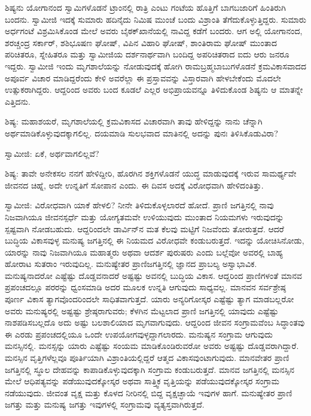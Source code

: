ಶಿಷ್ಯನು ಯೋಗಾನಂದ ಸ್ವಾಮಿಗಳೊಡನೆ ಟ್ರಾಂನಲ್ಲಿ ರಾತ್ರಿ ಎಂಟು ಗಂಟೆಯ ಹೊತ್ತಿಗೆ ಬಾಗಬಜಾರಿಗೆ ಹಿಂತಿರುಗಿ ಬಂದನು. ಸ್ವಾಮೀಜಿ ಇದಕ್ಕೆ ಸುಮಾರು ಹದಿನೈದು ನಿಮಿಷ ಮುಂಚೆ ಬಂದು ವಿಶ್ರಾಂತಿ ತೆಗೆದುಕೊಳ್ಳುತ್ತಿದ್ದರು. ಸುಮಾರು ಅರ್ಧಗಂಟೆ ವಿಶ್ರಮಿಸಿಕೊಂಡ ಮೇಲೆ ಅವರು ಬೈಠಕ್‌ಖಾನೆಯಲ್ಲಿ ನಾವಿದ್ದ ಕಡೆಗೆ ಬಂದರು. ಆಗ ಅಲ್ಲಿ ಯೋಗಾನಂದ, ಶರಚ್ಚಂದ್ರ ಸರ್ಕಾರ್, ಶಶಿಭೂಷಣ ಘೋಷ್, ವಿಪಿನ ವಿಹಾರಿ ಘೋಷ್, ಶಾಂತಿರಾಮ ಘೋಷ್ ಮುಂತಾದ ಪರಿಚಿತರೂ, ಸ್ನೇಹಿತರೂ ಮತ್ತು ಸ್ವಾಮೀಜಿಯ ದರ್ಶನಾರ್ಥವಾಗಿ ಬಂದಿದ್ದ ಅಪರಿಚಿತರಾದ ಐದು ಆರು ಜನರೂ ಇದ್ದರು. ಸ್ವಾಮೀಜಿ ಇಂದು ಮೃಗಶಾಲೆಯನ್ನು ನೋಡುವುದಕ್ಕೆ ಹೋಗಿ ರಾಮಬ್ರಹ್ಮಬಾಬುಗಳೊಡನೆ ಕ್ರಮವಿಕಾಸವಾದದ ಅಪೂರ್ವ ವಿಚಾರ ಮಾಡಿದ್ದರೆಂದು ಕೇಳಿ ಅವರೆಲ್ಲಾ ಈ ಪ್ರಸ್ತಾವವನ್ನು ವಿಸ್ತಾರವಾಗಿ ಹೇಳಬೇಕೆಂದು ಮೊದಲೇ ಉತ್ಸುಕರಾಗಿದ್ದರು. ಆದ್ದರಿಂದ ಅವರು ಬಂದ ಕೂಡಲೆ ಎಲ್ಲರ ಅಭಿಪ್ರಾಯವನ್ನೂ ತಿಳಿದುಕೊಂಡ ಶಿಷ್ಯನು ಆ ಮಾತನ್ನೇ ಎತ್ತಿದನು.

ಶಿಷ್ಯ: ಮಹಾಶಯರೆ, ಮೃಗಶಾಲೆಯಲ್ಲಿ ಕ್ರಮವಿಕಾಸದ ವಿಚಾರವಾಗಿ ತಾವು ಹೇಳಿದ್ದನ್ನು ನಾನು ಚೆನ್ನಾಗಿ ಅರ್ಥಮಾಡಿಕೊಳ್ಳುವುದಕ್ಕಾಗಲಿಲ್ಲ. ದಯಮಾಡಿ ಸುಲಭವಾದ ಮಾತಿನಲ್ಲಿ ಅದನ್ನು ಪುನಃ ತಿಳಿಸಿಕೊಡುವಿರಾ?

ಸ್ವಾಮೀಜಿ: ಏಕೆ, ಅರ್ಥವಾಗಲಿಲ್ಲವೆ?

ಶಿಷ್ಯ: ತಾವೇ ಅನೇಕಸಲ ನನಗೆ ಹೇಳಿದ್ದೀರಿ, ಹೊರಗಿನ ಶಕ್ತಿಗಳೊಡನೆ ಯುದ್ಧ ಮಾಡುವುದಕ್ಕೆ ಇರುವ ಸಾಮರ್ಥ್ಯವೇ ಜೀವನದ ಚಿಹ್ನೆ, ಅದೇ ಉನ್ನತಿಗೆ ಸೋಪಾನ ಎಂದು. ಈ ದಿವಸ ಅದಕ್ಕೆ ವಿರೋಧವಾಗಿ ಹೇಳಿದಂತಿತ್ತು.

ಸ್ವಾಮೀಜಿ: ವಿರೋಧವಾಗಿ ಯಾಕೆ ಹೇಳಲಿ? ನೀನೇ ತಿಳಿದುಕೊಳ್ಳಲಾರದೆ ಹೋದೆ. ಪ್ರಾಣಿ ಜಗತ್ತಿನಲ್ಲಿ ನಾವು ನಿಜವಾಗಿಯೂ ಜೀವನಸ್ಪರ್ಧೆ ಮತ್ತು ಯೋಗ್ಯತಮವೇ ಉಳಿಯುವುದು ಮುಂತಾದ ನಿಯಮಗಳು ಇರುವುದನ್ನು ಸ್ಪಷ್ಟವಾಗಿ ನೋಡಬಹುದು. ಆದ್ದರಿಂದಲೇ ಡಾರ್ವಿನ್‌ನ ಮತ ಕೆಲವು ಮಟ್ಟಿಗೆ ನಿಜವೆಂದು ತೋರುತ್ತದೆ. ಆದರೆ ಬುದ್ಧಿಯ ವಿಕಾಸವುಳ್ಳ ಮನುಷ್ಯ ಜಗತ್ತಿನಲ್ಲಿ ಈ ನಿಯಮದ ವಿರೋಧವೇ ಕಂಡುಬರುತ್ತದೆ. ಇದನ್ನು ಯೋಚಿಸಿನೋಡು, ಯಾರನ್ನು ನಾವು ನಿಜವಾಗಿಯೂ ಮಹಾತ್ಮರು ಅಥವಾ ಆದರ್ಶ ಪುರುಷರು ಎಂದು ಬಲ್ಲೆವೋ ಅವರಲ್ಲಿ ಬಾಹ್ಯ ಹೋರಾಟ ಸುತರಾಂ ಇರುವುದಿಲ್ಲ. ಮನುಷ್ಯೇತರ ಪ್ರಾಣಿಜಗತ್ತಿನಲ್ಲಿ ಜ್ಞಾನದ ಪ್ರಾಬಲ್ಯ ಅಸ್ವಾಭಾವಿಕ. ಮನುಷ್ಯನಾದರೋ ಎಷ್ಟೆಷ್ಟು ದೊಡ್ಡವನಾದರೆ ಅಷ್ಟಷ್ಟು ಅವನಲ್ಲಿ ಬುದ್ಧಿಯ ವಿಕಾಸ. ಆದ್ದರಿಂದ ಪ್ರಾಣಿಗಳಂತೆ ಮಾನವ ಪ್ರಪಂಚದಲ್ಲೂ ಪರರನ್ನು ಧ್ವಂಸಮಾಡಿ ಅದರ ಮೂಲಕ ಉನ್ನತಿ ಆಗುವುದು ಸಾಧ್ಯವಲ್ಲ. ಮಾನವನ ಸರ್ವಶ್ರೇಷ್ಠ ಪೂರ್ಣ ವಿಕಾಸ ತ್ಯಾಗವೊಂದರಿಂದಲೇ ಸಾಧಿತವಾಗುತ್ತದೆ. ಯಾರು ಅನ್ಯರಿಗೋಸ್ಕರ ಎಷ್ಟೆಷ್ಟು ತ್ಯಾಗ ಮಾಡಬಲ್ಲರೋ ಅವರು ಮನುಷ್ಯರಲ್ಲಿ ಅಷ್ಟಷ್ಟು ಶ್ರೇಷ್ಠರಾಗುವರು; ಕೆಳಗಿನ ಮೆಟ್ಟಲಾದ ಪ್ರಾಣಿ ಜಗತ್ತಿನಲ್ಲಿ ಯಾವುದು ಎಷ್ಟೆಷ್ಟು ನಾಶಪಡಿಸಬಲ್ಲದೊ ಅದು ಅಷ್ಟು ಬಲಶಾಲಿಯಾದ ಮೃಗವಾಗುವುದು. ಆದ್ದರಿಂದ ಜೀವನ ಸಂಗ್ರಾಮವೆಂಬ ಸಿದ್ಧಾಂತವು ಈ ಎರಡು ಪ್ರಪಂಚದಲ್ಲಿಯೂ ಒಂದೇ ಉಪಯೋಗವುಳ್ಳದ್ದಾಗಲಾರದು. ಮನುಷ್ಯನ ಸಂಗ್ರಾಮ ಆಗುವುದು ಮನಸ್ಸಿನಲ್ಲಿ. ಮನಸ್ಸನ್ನು ಯಾರು ಎಷ್ಟೆಷ್ಟು ಸಂಯಮ ಮಾಡಿಕೊಂಡಿರುವರೋ ಅವರು ಅಷ್ಟಷ್ಟು ದೊಡ್ಡವರಾಗಿದ್ದಾರೆ. ಮನಸ್ಸಿನ ವೃತ್ತಿಗಳೆಲ್ಲವೂ ಪೂರ್ತಿಯಾಗಿ ವಿಶ್ರಾಂತಿಯಲ್ಲಿದ್ದರೆ ಆತ್ಮದ ವಿಕಾಸವುಂಟಾಗುವುದು. ಮಾನವೇತರ ಪ್ರಾಣಿ ಜಗತ್ತಿನಲ್ಲಿ ಸ್ಥೂಲ ದೇಹವನ್ನು ಕಾಪಾಡಿಕೊಳ್ಳುವುದಕ್ಕಾಗಿ ಸಂಗ್ರಾಮ ಕಂಡುಬರುತ್ತದೆ. ಮಾನವ ಜಗತ್ತಿನಲ್ಲಿ ಮನಸ್ಸಿನ ಮೇಲೆ ಆಧಿಪತ್ಯವನ್ನು ಪಡೆಯುವುದಕ್ಕೋಸ್ಕರ ಅಥವಾ ಸಾತ್ತ್ವಿಕ ವೃತ್ತಿಯನ್ನು ಪಡೆಯುವುದಕ್ಕೋಸ್ಕರ ಸಂಗ್ರಾಮ ನಡೆಯುವುದು. ಜೀವಂತ ವೃಕ್ಷ ಮತ್ತು ಕೊಳದ ನೀರಿನಲ್ಲಿ ಬಿದ್ದ ವೃಕ್ಷಚ್ಛಾಯೆ ಇವುಗಳ ಹಾಗೆ. ಮನುಷ್ಯೇತರ ಪ್ರಾಣಿ ಜಗತ್ತು ಮತ್ತು ಮನುಷ್ಯ ಜಗತ್ತು ಇವುಗಳಲ್ಲಿ ಸಂಗ್ರಾಮವು ವ್ಯತ್ಯಸ್ತವಾಗಿರುತ್ತದೆ.

